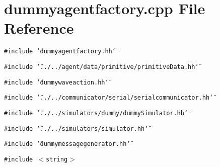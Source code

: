 \section{dummyagentfactory.cpp File Reference}
\label{dummyagentfactory_8cpp}


{\tt \#include \char`\"{}dummyagentfactory.hh\char`\"{}}\par
{\tt \#include \char`\"{}../../agent/data/primitive/primitiveData.hh\char`\"{}}\par
{\tt \#include \char`\"{}dummywaveaction.hh\char`\"{}}\par
{\tt \#include \char`\"{}../../communicator/serial/serialcommunicator.hh\char`\"{}}\par
{\tt \#include \char`\"{}../../simulators/dummy/dummySimulator.hh\char`\"{}}\par
{\tt \#include \char`\"{}../../simulators/simulator.hh\char`\"{}}\par
{\tt \#include \char`\"{}dummymessagegenerator.hh\char`\"{}}\par
{\tt \#include $<$string$>$}\par
